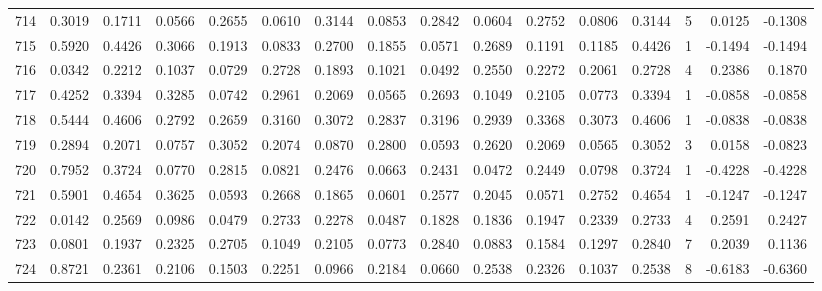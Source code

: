 \begin{tabular}{lrrrrrrrrrrrrrrr}
714 &      0.3019 &  0.1711 &  0.0566 &  0.2655 &  0.0610 &  0.3144 &  0.0853 &  0.2842 &  0.0604 &  0.2752 &   0.0806 &     0.3144 &      5 &                    0.0125 &                    -0.1308 \\
715 &      0.5920 &  0.4426 &  0.3066 &  0.1913 &  0.0833 &  0.2700 &  0.1855 &  0.0571 &  0.2689 &  0.1191 &   0.1185 &     0.4426 &      1 &                   -0.1494 &                    -0.1494 \\
716 &      0.0342 &  0.2212 &  0.1037 &  0.0729 &  0.2728 &  0.1893 &  0.1021 &  0.0492 &  0.2550 &  0.2272 &   0.2061 &     0.2728 &      4 &                    0.2386 &                     0.1870 \\
717 &      0.4252 &  0.3394 &  0.3285 &  0.0742 &  0.2961 &  0.2069 &  0.0565 &  0.2693 &  0.1049 &  0.2105 &   0.0773 &     0.3394 &      1 &                   -0.0858 &                    -0.0858 \\
718 &      0.5444 &  0.4606 &  0.2792 &  0.2659 &  0.3160 &  0.3072 &  0.2837 &  0.3196 &  0.2939 &  0.3368 &   0.3073 &     0.4606 &      1 &                   -0.0838 &                    -0.0838 \\
719 &      0.2894 &  0.2071 &  0.0757 &  0.3052 &  0.2074 &  0.0870 &  0.2800 &  0.0593 &  0.2620 &  0.2069 &   0.0565 &     0.3052 &      3 &                    0.0158 &                    -0.0823 \\
720 &      0.7952 &  0.3724 &  0.0770 &  0.2815 &  0.0821 &  0.2476 &  0.0663 &  0.2431 &  0.0472 &  0.2449 &   0.0798 &     0.3724 &      1 &                   -0.4228 &                    -0.4228 \\
721 &      0.5901 &  0.4654 &  0.3625 &  0.0593 &  0.2668 &  0.1865 &  0.0601 &  0.2577 &  0.2045 &  0.0571 &   0.2752 &     0.4654 &      1 &                   -0.1247 &                    -0.1247 \\
722 &      0.0142 &  0.2569 &  0.0986 &  0.0479 &  0.2733 &  0.2278 &  0.0487 &  0.1828 &  0.1836 &  0.1947 &   0.2339 &     0.2733 &      4 &                    0.2591 &                     0.2427 \\
723 &      0.0801 &  0.1937 &  0.2325 &  0.2705 &  0.1049 &  0.2105 &  0.0773 &  0.2840 &  0.0883 &  0.1584 &   0.1297 &     0.2840 &      7 &                    0.2039 &                     0.1136 \\
724 &      0.8721 &  0.2361 &  0.2106 &  0.1503 &  0.2251 &  0.0966 &  0.2184 &  0.0660 &  0.2538 &  0.2326 &   0.1037 &     0.2538 &      8 &                   -0.6183 &                    -0.6360 \\

\end{tabular}
